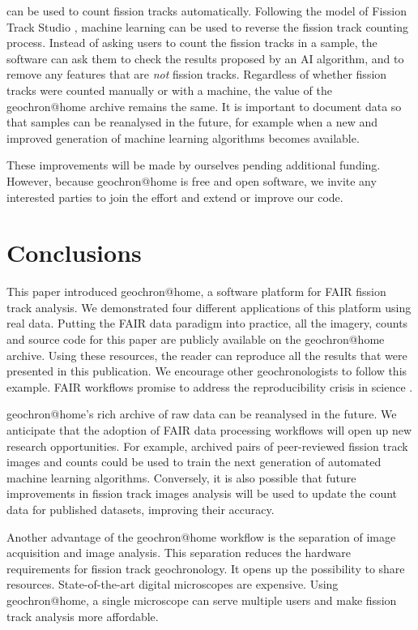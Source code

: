 \documentclass[gchron, manuscript]{copernicus}
\begin{document}
\begin{enumerate}
  can be used to count fission tracks automatically. Following the
  model of Fission Track Studio \citep{gleadow2009, gleadow2019},
  machine learning can be used to reverse the fission track counting
  process. Instead of asking users to count the fission tracks in a
  sample, the software can ask them to check the results proposed by
  an AI algorithm, and to remove any features that are \emph{not}
  fission tracks.  Regardless of whether fission tracks were counted
  manually or with a machine, the value of the geochron@home archive
  remains the same. It is important to document data so that samples
  can be reanalysed in the future, for example when a new and improved
  generation of machine learning algorithms becomes available.
\end{enumerate}

These improvements will be made by ourselves pending additional
funding. However, because geochron@home is free and open software, we
invite any interested parties to join the effort and extend or improve
our code.

\section{Conclusions}\label{sec:conclusions}

This paper introduced geochron@home, a software platform for FAIR
fission track analysis. We demonstrated four different applications of
this platform using real data. Putting the FAIR data paradigm into
practice, all the imagery, counts and source code for this paper are
publicly available on the geochron@home archive. Using these
resources, the reader can reproduce all the results that were
presented in this publication.  We encourage other geochronologists to
follow this example.  FAIR workflows promise to address the
reproducibility crisis in science \citep{miyakawa2020}.\medskip

geochron@home's rich archive of raw data can be reanalysed in
the future. We anticipate that the adoption of FAIR data processing
workflows will open up new research opportunities. For example,
archived pairs of peer-reviewed fission track images and counts could
be used to train the next generation of automated machine learning
algorithms. Conversely, it is also possible that future improvements
in fission track images analysis will be used to update the count data
for published datasets, improving their accuracy.\medskip

Another advantage of the geochron@home workflow is the separation of
image acquisition and image analysis. This separation reduces the
hardware requirements for fission track geochronology. It opens up the
possibility to share resources. State-of-the-art digital microscopes
are expensive. Using geochron@home, a single microscope can serve
multiple users and make fission track analysis more
affordable.\medskip
\end{document}

